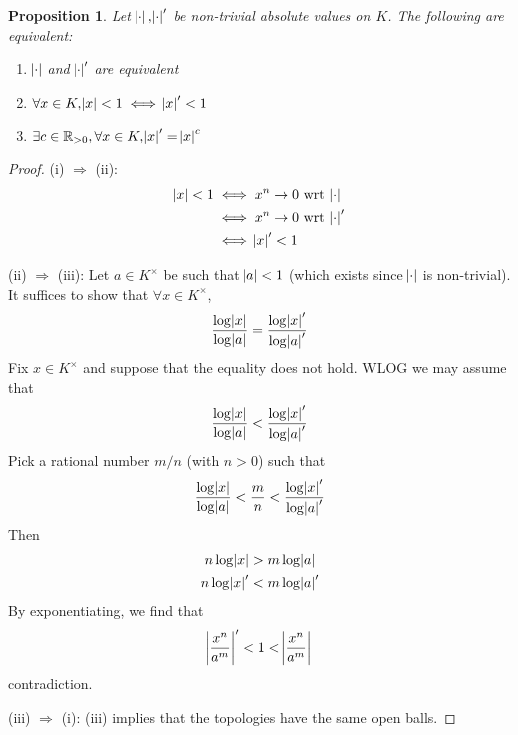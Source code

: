 \documentclass[12pt]{amsart}
\theoremstyle{definition}
\theoremstyle{plain}
\newtheorem{proposition}[definition]{Proposition}
\theoremstyle{remark}
\newcommand{\bR}{\mathbb{R}}
\begin{document}
\begin{proposition}\label{prop:1_3}
    Let $\abs{\cdot}, \abs{\cdot}'$ be non-trivial absolute values on $K$. The following are equivalent:
    \begin{enumerate}
        \item $\abs{\cdot}$ and $\abs{\cdot}'$ are \emph{equivalent}
        \item $\forall x \in K, \abs{x} < 1 \iff \abs{x}' < 1$
        \item $\exists c \in \bR_{> 0}, \forall x \in K, \abs{x}' = \abs{x}^c$
    \end{enumerate}
\end{proposition}
\begin{proof}
    (i) $\Rightarrow$ (ii):
    \begin{align*}
        \abs{x} < 1
        &\iff x^n \rightarrow 0 \text{ wrt } \abs{\cdot}\\
        &\iff x^n \rightarrow 0 \text{ wrt } \abs{\cdot}'\\
        &\iff \abs{x}' < 1
    \end{align*}

    \noindent(ii) $\Rightarrow$ (iii): Let $a \in K^\times$ be such that $\abs{a} < 1$ (which exists since $\abs{\cdot}$ is non-trivial). It suffices to show that $\forall x \in K^\times$,
    \begin{equation*}
        \frac{\log{\abs{x}}}{\log{\abs{a}}} = \frac{\log{\abs{x}'}}{\log{\abs{a}'}}
    \end{equation*}
    Fix $x \in K^\times$ and suppose that the equality does not hold. WLOG we may assume that
    \begin{equation*}
        \frac{\log{\abs{x}}}{\log{\abs{a}}} < \frac{\log{\abs{x}'}}{\log{\abs{a}'}}
    \end{equation*}
    Pick a rational number $m/n$ (with $n > 0$) such that
    \begin{equation*}
        \frac{\log{\abs{x}}}{\log{\abs{a}}} < \frac{m}{n} < \frac{\log{\abs{x}'}}{\log{\abs{a}'}}
    \end{equation*}
    Then
    \begin{align*}
        n \log{\abs{x}} &> m \log{\abs{a}} \\
        n \log{\abs{x}'} &< m \log{\abs{a}'}
    \end{align*}
    By exponentiating, we find that
    \begin{equation*}
        \abs{\frac{x^n}{a^m}}' < 1 < \abs{\frac{x^n}{a^m}}
    \end{equation*}
    contradiction.

    \noindent (iii) $\Rightarrow$ (i): (iii) implies that the topologies have the same open balls.
\end{proof}
\end{document}
